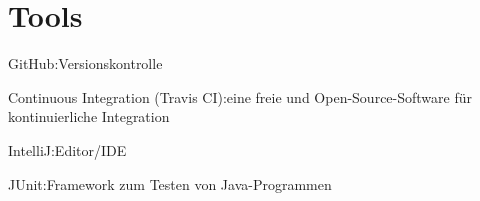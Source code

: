 \section{Tools}

\item GitHub:Versionskontrolle
\item Continuous Integration (Travis CI):eine freie und Open-Source-Software für kontinuierliche
Integration
\item IntelliJ:Editor/IDE
\item JUnit:Framework zum Testen von Java-Programmen
